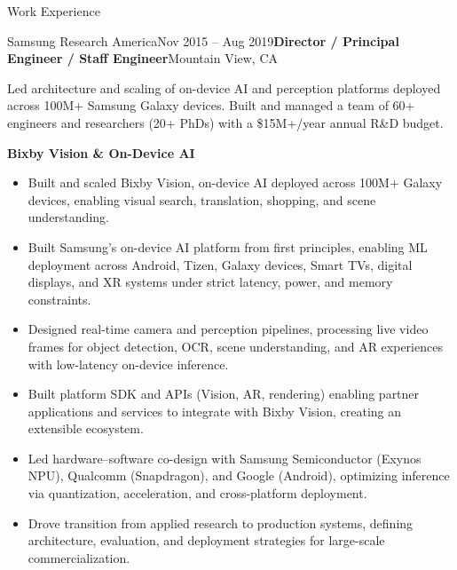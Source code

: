 \documentclass[
	10pt, %
]{resume} %
\begin{document}
\begin{rSection}{Work Experience}
	
\begin{rSubsection}{Samsung Research America}{Nov 2015 -- Aug 2019}{\textbf{Director / Principal Engineer / Staff Engineer}}{Mountain View, CA}

  \item Led architecture and scaling of on-device AI and perception platforms deployed across 100M+ Samsung Galaxy devices. Built and managed a team of 60+ engineers and researchers (20+ PhDs) with a \$15M+/year annual R\&D budget.

  \item[] \textbf{Bixby Vision \& On-Device AI}
  \begin{itemize}
  
\item Built and scaled Bixby Vision, on-device AI deployed across 100M+ Galaxy devices, enabling visual search, translation, shopping, and scene understanding.
 \item Built Samsung’s on-device AI platform from first principles, enabling ML deployment across Android, Tizen, Galaxy devices, Smart TVs, digital displays, and XR systems under strict latency, power, and memory constraints.
 \item Designed real-time camera and perception pipelines, processing live video frames for object detection, OCR, scene understanding, and AR experiences with low-latency on-device inference.
 \item Built platform SDK and APIs (Vision, AR, rendering) enabling partner applications and services to integrate with Bixby Vision, creating an extensible ecosystem.
 \item Led hardware–software co-design with Samsung Semiconductor (Exynos NPU), Qualcomm (Snapdragon), and Google (Android), optimizing inference via quantization, acceleration, and cross-platform deployment.
 \item Drove transition from applied research to production systems, defining architecture, evaluation, and deployment strategies for large-scale commercialization.


\end{itemize}


\end{rSubsection}
\end{rSection}
\end{document}
